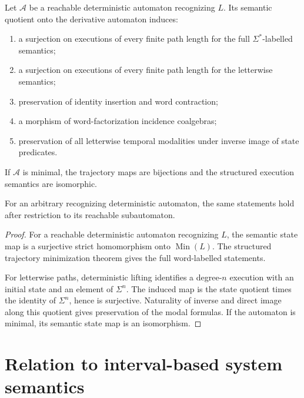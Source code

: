\begin{corollary}
\label{cor:finite-trajectory-minimization-deterministic-automata}
Let \(\mathcal A\) be a reachable deterministic automaton recognizing
\(L\). Its semantic quotient onto the derivative automaton induces:
\begin{enumerate}
    \item a surjection on executions of every finite path length for the full
    \(\Sigma^\ast\)-labelled semantics;
    \item a surjection on executions of every finite path length for the
    letterwise semantics;
    \item preservation of identity insertion and word contraction;
    \item a morphism of word-factorization incidence coalgebras;
    \item preservation of all letterwise temporal modalities under inverse
    image of state predicates.
\end{enumerate}
If \(\mathcal A\) is minimal, the trajectory maps are bijections and the
structured execution semantics are isomorphic.

For an arbitrary recognizing deterministic automaton, the same statements
hold after restriction to its reachable subautomaton.
\end{corollary}

\begin{proof}
For a reachable deterministic automaton recognizing \(L\), the semantic
state map is a surjective strict homomorphism onto
\(\operatorname{Min}(L)\). The structured trajectory minimization theorem
gives the full word-labelled statements.

For letterwise paths, deterministic lifting identifies a degree-\(n\)
execution with an initial state and an element of \(\Sigma^n\). The induced
map is the state quotient times the identity of \(\Sigma^n\), hence is
surjective. Naturality of inverse and direct image along this quotient gives
preservation of the modal formulas. If the automaton is minimal, its semantic
state map is an isomorphism.
\end{proof}

\section{Relation to interval-based system semantics}
\label{sec:relation-interval-based-semantics}

